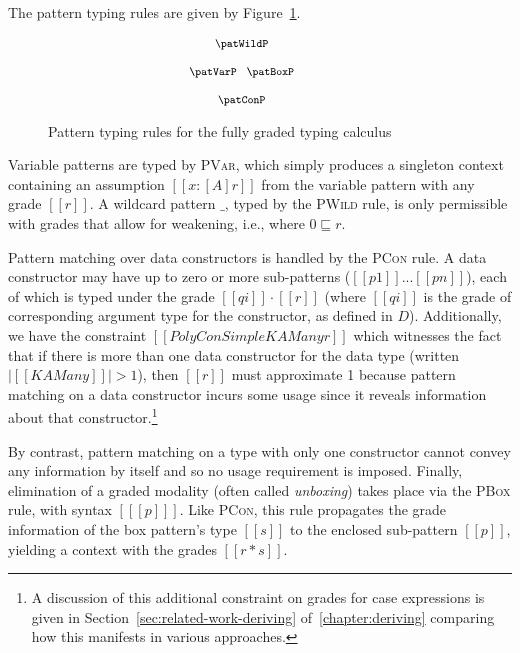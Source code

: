 The pattern typing rules are given by
Figure~\ref{fig:pat-typing}.

\begin{figure}[t]
    \begin{align*}
      {\footnotesize{
    \hspace{-3em}\begin{array}{c}
    \patWildP
    \\[1.25em]
    \patVarP
    \;\;\;
    \patBoxP
    \\[1.25em]
    \patConP
    \end{array}
      }}
    \end{align*}
    \vspace{-1.25em}
      \caption{Pattern typing rules for the fully graded typing calculus}
    \label{fig:pat-typing}
\end{figure}

Variable patterns are typed by \textsc{PVar}, which simply produces a singleton
context containing an assumption $[[ x : [A] r]]$ from the variable pattern with
any grade $[[ r ]]$. A wildcard pattern $\_$, typed by the \textsc{PWild} rule,
is only permissible with grades that allow for weakening, i.e., where $0
\sqsubseteq r$. 

Pattern matching over data constructors is handled by the
\textsc{PCon} rule. A data constructor may have up to zero or more sub-patterns
($[[ p1 ]] ... [[ pn ]]$), each of which is typed under the grade $[[ qi ]]
\cdot [[ r ]]$ (where $[[ qi ]]$ is the grade of corresponding argument type for
the constructor, as defined in $D$). Additionally, we have the constraint
$[[{PolyConSimple {K {A Many}} r}]]$ which witnesses the fact that if there is
more than one data constructor for the data type (written $|[[ K {A Many} ]]| >
1$), then $[[ r ]]$ must approximate 1 because pattern matching on a data
constructor incurs some usage since it reveals information about that
constructor.\footnote{A discussion of this additional constraint on grades for
case expressions is given in Section~\ref{sec:related-work-deriving}
of~\ref{chapter:deriving} comparing how this manifests in various approaches.}

By contrast, pattern matching on a type with only one constructor cannot convey
any information by itself and so no usage requirement is imposed. Finally,
elimination of a graded modality (often called \textit{unboxing}) takes place
via the \textsc{PBox} rule, with syntax $[[ [p] ]]$. Like \textsc{PCon}, this
rule propagates the grade information of the box pattern's type $[[s]]$ to the
enclosed sub-pattern $[[ p ]]$, yielding a context with the grades $[[r * s]]$.

